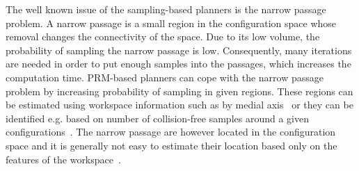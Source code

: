 \documentclass[usletter, 10pt, conference]{ieeeconf} %
\def\C{\mathcal{C}}
\begin{document}
The well known issue of the sampling-based planners is the narrow passage problem.
A narrow passage is a small region in the configuration space whose removal changes the connectivity of the space.
Due to its low volume, the probability of sampling the narrow passage is low.
Consequently, many iterations are needed in order to put enough samples into the passages, which increases the computation time.
PRM-based planners can cope with the narrow passage problem by increasing probability of sampling in given regions.
These regions can be estimated using workspace information such as by medial axis~\cite{amatoOBRRT,amato2002using,wilmarthMAPRM} 
or they can be identified e.g. based on number of collision-free samples around a given configurations~\cite{overmarsGauss,hsuBridge}.
The narrow passage are however located in the configuration space and it is generally not easy to estimate their location
based only on the features of the workspace~\cite{hannaWIS}.

\end{document}
